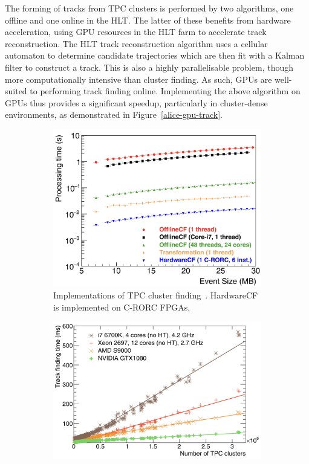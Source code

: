 The forming of tracks from TPC clusters is performed by two algorithms, one offline and one online in the HLT. The latter of these benefits from hardware acceleration, using GPU resources in the HLT farm to accelerate track reconstruction. The HLT track reconstruction algorithm uses a cellular automaton to determine candidate trajectories which are then fit with a Kalman filter to construct a track. This is also a highly parallelisable problem, though more computationally intensive than cluster finding. As such, GPUs are well-suited to performing track finding online. Implementing the above algorithm on GPUs thus provides a significant speedup, particularly in cluster-dense environments, as demonstrated in Figure~\ref{alice-gpu-track}.

\begin{figure}[h!]
    \centering
    \begin{subfigure}[b]{0.445\linewidth}
        \centering
        \includegraphics[width=\linewidth]{images/alice/alice-fpga-cluster.png}
        \caption{Implementations of TPC cluster finding~\cite{alice-trigger-run3}. HardwareCF is implemented on C-RORC FPGAs.}
        \label{alice-fpga-plot}
    \end{subfigure}
    \begin{subfigure}[b]{0.505\linewidth}
        \centering
        \includegraphics[width=\linewidth]{images/alice/alice-gpu-track.png}

\end{subfigure}
\end{figure}
